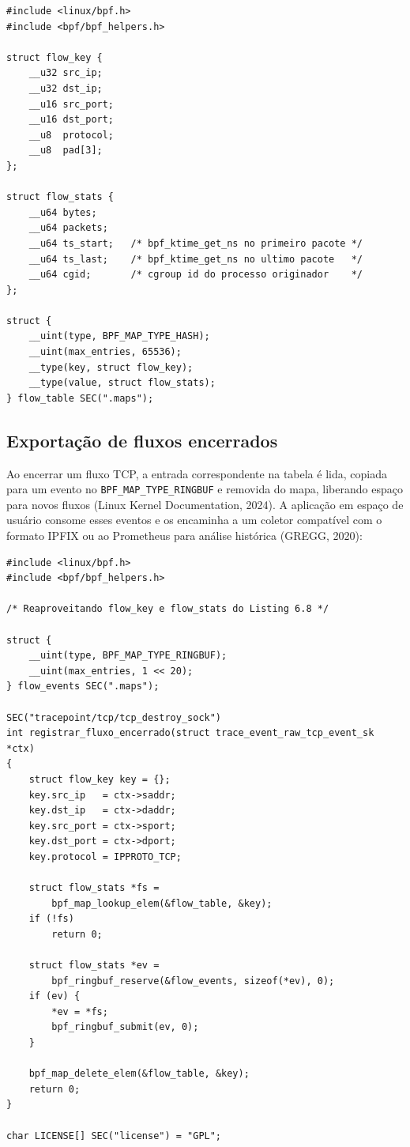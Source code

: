 \begin{lstlisting}[caption={Estruturas de chave e valor para tabela de fluxos ativos.}, label=lst:obs-flow-structs]
#include <linux/bpf.h>
#include <bpf/bpf_helpers.h>

struct flow_key {
    __u32 src_ip;
    __u32 dst_ip;
    __u16 src_port;
    __u16 dst_port;
    __u8  protocol;
    __u8  pad[3];
};

struct flow_stats {
    __u64 bytes;
    __u64 packets;
    __u64 ts_start;   /* bpf_ktime_get_ns no primeiro pacote */
    __u64 ts_last;    /* bpf_ktime_get_ns no ultimo pacote   */
    __u64 cgid;       /* cgroup id do processo originador    */
};

struct {
    __uint(type, BPF_MAP_TYPE_HASH);
    __uint(max_entries, 65536);
    __type(key, struct flow_key);
    __type(value, struct flow_stats);
} flow_table SEC(".maps");
\end{lstlisting}

\subsection*{Exportação de fluxos encerrados}

Ao encerrar um fluxo TCP, a entrada correspondente na tabela é lida, copiada para
um evento no \texttt{BPF\_MAP\_TYPE\_RINGBUF} e removida do mapa, liberando espaço
para novos fluxos (Linux Kernel Documentation, 2024). A aplicação em espaço de
usuário consome esses eventos e os encaminha a um coletor compatível com o formato
IPFIX ou ao Prometheus para análise histórica (GREGG, 2020):

\begin{lstlisting}[caption={Emissão de registro de fluxo encerrado via ringbuf.}, label=lst:obs-flow-close]
#include <linux/bpf.h>
#include <bpf/bpf_helpers.h>

/* Reaproveitando flow_key e flow_stats do Listing 6.8 */

struct {
    __uint(type, BPF_MAP_TYPE_RINGBUF);
    __uint(max_entries, 1 << 20);
} flow_events SEC(".maps");

SEC("tracepoint/tcp/tcp_destroy_sock")
int registrar_fluxo_encerrado(struct trace_event_raw_tcp_event_sk *ctx)
{
    struct flow_key key = {};
    key.src_ip   = ctx->saddr;
    key.dst_ip   = ctx->daddr;
    key.src_port = ctx->sport;
    key.dst_port = ctx->dport;
    key.protocol = IPPROTO_TCP;

    struct flow_stats *fs =
        bpf_map_lookup_elem(&flow_table, &key);
    if (!fs)
        return 0;

    struct flow_stats *ev =
        bpf_ringbuf_reserve(&flow_events, sizeof(*ev), 0);
    if (ev) {
        *ev = *fs;
        bpf_ringbuf_submit(ev, 0);
    }

    bpf_map_delete_elem(&flow_table, &key);
    return 0;
}

char LICENSE[] SEC("license") = "GPL";
\end{lstlisting}

